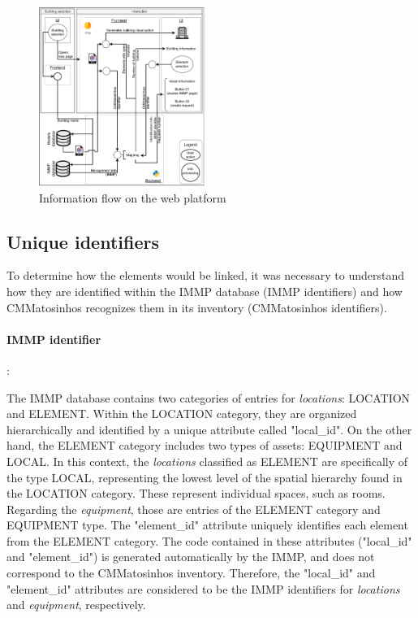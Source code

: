 \documentclass[a4paper, 10pt, twocolumn, twoside]{article}
\begin{document}
\begin{figure}[!htb]
    \centering
    \includegraphics[width=0.48\textwidth]{Images/fluxo.pdf}
    \caption{Information flow on the web platform}
    \label{fig_fluxo}
\end{figure}

\subsection{Unique identifiers}
\label{subsec:identifiers}

To determine how the elements would be linked, it was necessary to understand how they are identified within the IMMP database (IMMP identifiers) and how CMMatosinhos recognizes them in its inventory (CMMatosinhos identifiers).

\paragraph{IMMP identifier}:

The IMMP database contains two categories of entries for \emph{locations}: LOCATION and ELEMENT. Within the LOCATION category, they are organized hierarchically and identified by a unique attribute called "local\_id". On the other hand, the ELEMENT category includes two types of assets: EQUIPMENT and LOCAL. In this context, the \emph{locations} classified as ELEMENT are specifically of the type LOCAL, representing the lowest level of the spatial hierarchy found in the LOCATION category. These represent individual spaces, such as rooms. Regarding the \emph{equipment}, those are entries of the ELEMENT category and EQUIPMENT type. The "element\_id" attribute uniquely identifies each element from the ELEMENT category. The code contained in these attributes ("local\_id" and "element\_id") is generated automatically by the IMMP, and does not correspond to the CMMatosinhos inventory. Therefore, the "local\_id" and "element\_id" attributes are considered to be the IMMP identifiers for \emph{locations} and \emph{equipment}, respectively.
\end{document}
